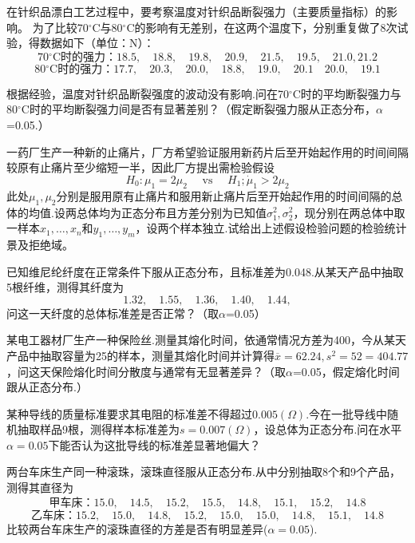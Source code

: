 \begin{xiti}
	\item 在针织品漂白工艺过程中，要考察温度对针织品断裂强力（主要质量指标）的影响。
	为了比较70$^{\circ}$C与80$^{\circ}$C的影响有无差别，在这两个温度下，分别重复做了8次试验，得数据如下（单位：N）：
	\[\text{70$^{\circ}$C时的强力：}18.5,\quad18.8,\quad19.8 , \quad 20.9 , \quad 21.5 , \quad 19.5 , \quad 21.0,21.2\]
	\[\text{80$^{\circ}$C时的强力：}17.7,\quad 20.3,\quad 20.0,\quad 18.8,\quad 19.0,\quad 20.1\quad 20.0,\quad 19.1\]
	
	根据经验，温度对针织品断裂强度的波动没有影响.问在70$^{\circ}$C时的平均断裂强力与80$^{\circ}$C时的平均断裂强力间是否有显著差别？（假定断裂强力服从正态分布，$\alpha$=0.05.）
	
	\item 一药厂生产一种新的止痛片，厂方希望验证服用新药片后至开始起作用的时间间隔较原有止痛片至少缩短一半，因此厂方提出需检验假设
	\[H _ { 0 } : \mu _ { 1 } = 2 \mu _ { 2 } \quad \text { vs } \quad H _ { 1 } ; \dot { \mu } _ { 1 } > 2 \mu _ { 2 }\]
	此处$\mu_{1},\mu_{2}$分别是服用原有止痛片和服用新止痛片后至开始起作用的时间间隔的总体的均值.设两总体均为正态分布且方差分别为已知值$\sigma_{1}^{2},\sigma_{2}^{2}$，现分别在两总体中取一样本$x_{1},\dotsc,x_{n}$和$y_{1},\dotsc,y_{m}$，设两个样本独立.试给出上述假设检验问题的检验统计景及拒绝域。
	
	\item 已知维尼纶纤度在正常条件下服从正态分布，且标准差为0.048.从某天产品中抽取5根纤维，测得其纤度为
	\[1.32,\quad 1.55,\quad 1.36,\quad1.40,\quad1.44,\]
	问这一天纤度的总体标准差是否正常？（取$\alpha$=0.05）
	
	\item 某电工器材厂生产一种保险丝.测量其熔化时间，依通常情况方差为400，今从某天产品中抽取容量为25的样本，测量其熔化时间并计算得$\overline{ x }=62.24,s^{2}=52=404.77$，问这天保险熔化时间分散度与通常有无显著差异？（取$\alpha$=0.05，假定熔化时间跟从正态分布.）
	
	\item 某种导线的质量标准要求其电阻的标准差不得超过$0.005 ( \Omega )$.今在一批导线中随机抽取样品9根，测得样本标准差为$s=0.007 ( \Omega )$，设总体为正态分布.问在水平$\alpha=0.05$下能否认为这批导线的标准差显著地偏大？
	
	\item 两台车床生产同一种滚珠，滚珠直径服从正态分布.从中分别抽取8个和9个产品，测得其直径为
	\[\text{甲车床：}15.0 , \quad 14.5 , \quad 15.2 , \quad 15.5 , \quad 14.8 , \quad 15.1 , \quad 15.2 , \quad 14.8\]
	\[\text{乙车床：}15.2 , \quad 15.0 , \quad 14.8 , \quad 15.2 , \quad 15.0 , \quad 15.0 , \quad 14.8 , \quad 15.1 , \quad 14.8\]
	比较两台车床生产的滚珠直径的方差是否有明显差异($\alpha=0.05$).
	

\end{xiti}
